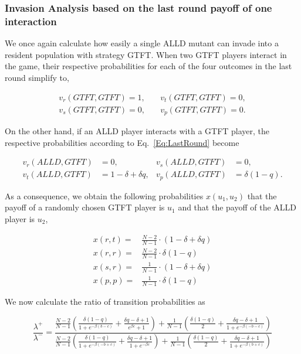 \documentclass[11pt]{article}
\theoremstyle{plainCl1}
\theoremstyle{plainCl2}
\begin{document}
\subsubsection*{Invasion Analysis based on the last round payoff of one interaction}

We once again calculate how easily a single ALLD mutant can invade into a
resident population with strategy GTFT. When two GTFT players interact in the
game, their respective probabilities for each of the four outcomes in the last
round simplify to,

\begin{align*}
    v_{r}(GTFT,GTFT) = 1, & \quad v_{t}(GTFT,GTFT) = 0, \\
    v_{s}(GTFT,GTFT) = 0, & \quad v_{p}(GTFT,GTFT) = 0.
\end{align*}

On the other hand, if an ALLD player interacts with a GTFT player, the
respective probabilities according to Eq.~\ref{Eq:LastRound} become

\begin{align*}
    v_{r}(ALLD,GTFT) & = 0, &  v_{s}(ALLD,GTFT) & = 0, \\
    v_{t} (ALLD, GTFT ) & = 1 - \delta + \delta q, &  v_{p} (ALLD, GTFT) & = \delta(1 - q).
\end{align*}

As a consequence, we obtain the following probabilities \(x(u_1, u_2)\) that the
payoff of a randomly chosen GTFT player is \(u_1\) and that the payoff of the
ALLD player is \(u_2\),

\begin{align*}
  x(r, t) = & \frac{N - 2}{N - 1} \cdot (1 - \delta + \delta q)\\
  x(r, r) = & \frac{N - 2}{N - 1} \cdot \delta (1 - q) \\
  x(s, r) = & \frac{1}{N - 1} \cdot (1 - \delta + \delta q) \\
  x(p, p) = & \frac{1}{N - 1} \cdot \delta (1 - q)
\end{align*}

We now calculate the ratio of transition probabilities as

\begin{equation*}
\frac{\lambda^{+}}{\lambda^{-}} = \frac{ \frac{N - 2}{N - 1}  \left( \frac{ \delta  \left(1 - q \right)}{1
+ e^{-  \beta  \left(b - c \right)}} +  \frac{ \delta q -  \delta + 1}{e^{ \beta
c} + 1} \right)  +  \frac{1}{N-1}  \left(\frac{ \delta  \left(1 - q \right)}{2} +
 \frac{ \delta q -  \delta + 1}{1 + e^{-  \beta  \left(- b - c \right)}}\right)}
 { \frac{N - 2}{N - 1}  \left( \frac{ \delta  \left(1 - q \right)}{1 +
e^{-  \beta  \left(- b + c \right)}} +  \frac{ \delta q -  \delta + 1}{1 + e^{-
 \beta c}} \right) +  \frac{1}{N -1} \left(\frac{ \delta  \left(1 - q \right)}{2} +
 \frac{ \delta q -  \delta + 1}{1 + e^{-  \beta  \left(b + c \right)}}\right)}
\end{equation*}
\end{document}
